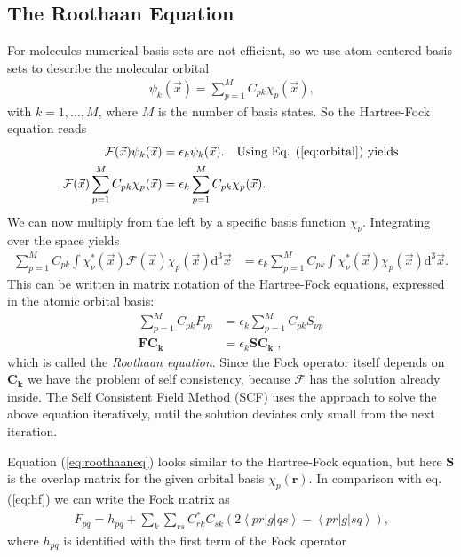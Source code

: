 \documentclass[twoside,        %
			   12pt,			%
               BCOR10mm,       %
               ngerman,english  %
               ]{scrartcl}
\begin{document}
\subsection{The Roothaan Equation}
For molecules numerical basis sets are not efficient, so we use atom centered basis sets to describe the molecular orbital
\begin{align}\label{eq:orbital}
    \psi_k(\vec{x}) = \sum_{p=1}^M C_{pk} \chi_p (\vec{x})\text{,}
\end{align}
with $k = 1,\dots, M$, where $M$ is the number of basis states.
So the Hartree-Fock equation reads
\begin{align*}
    \mathcal{F} (\vec{x})   \psi_k(\vec{x}) &= \epsilon_k    \psi_k(\vec{x})\text{.} \quad \text{Using Eq. (\ref{eq:orbital}) yields}\\
    \mathcal{F} (\vec{x})  \sum_{p=1}^M C_{pk} \chi_p (\vec{x}) &= \epsilon_k \sum_{p=1}^M C_{pk} \chi_p (\vec{x})\text{.}\\
\end{align*}
We can now multiply from the left by a specific basis function $\chi_\nu$. Integrating over the space yields
\begin{align*}
     \sum_{p=1}^M C_{pk} \int \chi_\nu^*(\vec{x})  \mathcal{F} (\vec{x}) \chi_p(\vec{x})\text{d}^3 \vec{x} & =  \epsilon_k  \sum_{p=1}^M C_{pk} \int \chi_\nu^*(\vec{x}) \chi_p(\vec{x})\text{d}^3 \vec{x}   \text{.}
\end{align*}
This can be written in matrix notation of the Hartree-Fock equations, expressed in the atomic orbital basis:
\begin{align}\label{eq:roothaaneq}
    \sum_{p=1}^M C_{pk} F_{\nu p}  &= \epsilon_k \sum_{p=1}^M C_{pk} S_{\nu p}\nonumber\\
    \mathbf{F} \mathbf{C_k} &= \epsilon_k \mathbf{S} \mathbf{C_k} \; \text{,}
\end{align} which is called the \textit{Roothaan equation}.
Since the Fock operator itself depends on $\mathbf{C_k}$ we have the problem of self consistency, because $\mathcal{F}$ has the solution already inside. The Self Consistent Field Method (SCF) uses the approach to solve the above equation iteratively, until the solution deviates only small from the next iteration.
\par Equation (\ref{eq:roothaaneq}) looks similar to the Hartree-Fock equation, but here $\mathbf{S}$ is the overlap matrix for the given orbital basis $\chi_p (\mathbf{r})$. In comparison with eq. (\ref{eq:hf}) we can write the Fock matrix as \cite{Thijssen2007}
\begin{align*}
F_{pq} = h_{pq} + \sum\limits_k \sum\limits_{rs} C_{rk}^* C_{sk} \left( 2 \left<pr|g|qs\right> -  \left<pr|g|sq\right> \right)\text{,}
\end{align*} where $h_{pq}$ is identified with the first term of the Fock operator
\end{document}
